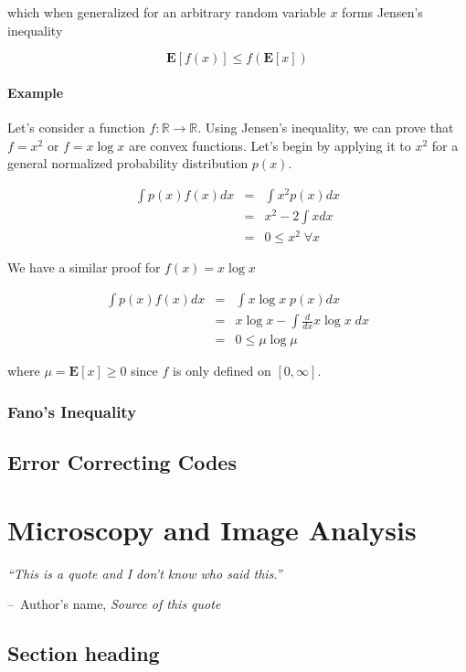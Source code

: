 \documentclass[a4paper,11pt]{book}
\makeatletter
\newenvironment{chapquote}[2][2em]
  {\setlength{\@tempdima}{#1}%
   \def\chapquote@author{#2}%
   \parshape 1 \@tempdima \dimexpr\textwidth-2\@tempdima\relax%
   \itshape}
  {\par\normalfont\hfill--\ \chapquote@author\hspace*{\@tempdima}\par\bigskip}
\makeatother
\begin{document}
which when generalized for an arbitrary random variable $x$ forms Jensen's inequality

\begin{equation}
\mathbf{E}[f(x)] \leq f(\mathbf{E}[x])
\end{equation}


\subsubsection{Example}

Let's consider a function $f: \mathbb{R} \rightarrow \mathbb{R}$. Using Jensen's inequality, we can prove that $f=x^{2}$ or $f=x\log x$ are convex functions. Let's begin by applying it to $x^{2}$ for a general normalized probability distribution $p(x)$.

\begin{eqnarray*}
\int p(x)f(x)dx & = & \int x^{2}p(x)dx\\
&=& x^{2} - 2\int xdx\\
&=& 0 \leq x^{2} \; \forall x
\end{eqnarray*}

We have a similar proof for $f(x) = x\log x$

\begin{eqnarray*}
\int p(x)f(x)dx & = & \int x\log x\; p(x)dx\\
&=& x\log x - \int \frac{d}{dx}x\log x\;dx\\
&=& 0 \leq \mu \log \mu
\end{eqnarray*}

where $\mu = \mathbf{E}[x] \geq 0$ since $f$ is only defined on $[0, \infty]$.

\subsection{Fano's Inequality}



\section{Error Correcting Codes}

\chapter{Microscopy and Image Analysis}

\begin{chapquote}{Author's name, \textit{Source of this quote}}
``This is a quote and I don't know who said this.''
\end{chapquote}

\section{Section heading}
\end{document}

